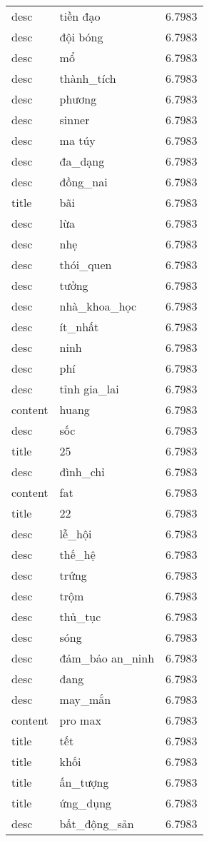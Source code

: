 \documentclass{article}
\begin{document}
\begin{tabular}{lll}
desc & tiền đạo & 6.7983\\
desc & đội bóng & 6.7983\\
desc & mổ & 6.7983\\
desc & thành\_tích & 6.7983\\
desc & phương & 6.7983\\
desc & sinner & 6.7983\\
desc & ma túy & 6.7983\\
desc & đa\_dạng & 6.7983\\
desc & đồng\_nai & 6.7983\\
title & bãi & 6.7983\\
desc & lừa & 6.7983\\
desc & nhẹ & 6.7983\\
desc & thói\_quen & 6.7983\\
desc & tưởng & 6.7983\\
desc & nhà\_khoa\_học & 6.7983\\
desc & ít\_nhất & 6.7983\\
desc & ninh & 6.7983\\
desc & phí & 6.7983\\
desc & tỉnh gia\_lai & 6.7983\\
content & huang & 6.7983\\
desc & sốc & 6.7983\\
title & 25 & 6.7983\\
desc & đình\_chỉ & 6.7983\\
content & fat & 6.7983\\
title & 22 & 6.7983\\
desc & lễ\_hội & 6.7983\\
desc & thế\_hệ & 6.7983\\
desc & trứng & 6.7983\\
desc & trộm & 6.7983\\
desc & thủ\_tục & 6.7983\\
desc & sóng & 6.7983\\
desc & đảm\_bảo an\_ninh & 6.7983\\
desc & đang & 6.7983\\
desc & may\_mắn & 6.7983\\
content & pro max & 6.7983\\
title & tết & 6.7983\\
title & khối & 6.7983\\
title & ấn\_tượng & 6.7983\\
title & ứng\_dụng & 6.7983\\
desc & bất\_động\_sản & 6.7983\\

\end{tabular}
\end{document}
